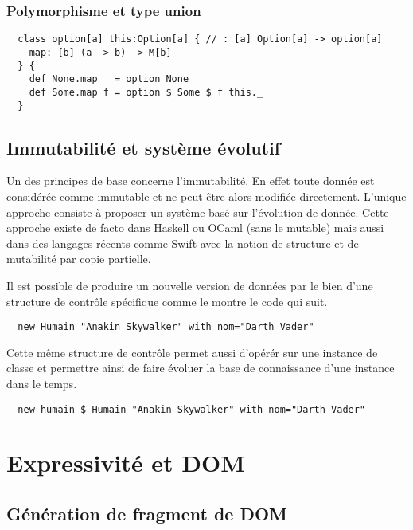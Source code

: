 \documentclass[twoside,a4paper]{article}
\begin{document}
\subsubsection{Polymorphisme et type union}

\lstset{language=Thicket}
\begin{lstlisting}
  class option[a] this:Option[a] { // : [a] Option[a] -> option[a]
    map: [b] (a -> b) -> M[b]
  } {
    def None.map _ = option None
    def Some.map f = option $ Some $ f this._
  }
\end{lstlisting}

\subsection{Immutabilité et système évolutif}

Un  des principes  de base  concerne l'immutabilité.   En effet  toute
donnée est considérée  comme immutable et ne peut  être alors modifiée
directement. L'unique approche consiste à proposer un système basé sur
l'évolution de donnée. Cette approche  existe de facto dans Haskell ou
OCaml (sans  le mutable)  mais aussi dans  des langages  récents comme
Swift \cite{Swift}  avec la notion  de structure et de  mutabilité par
copie partielle.

Il est possible de produire un nouvelle version de données par le bien
d'une structure  de contrôle  spécifique comme le  montre le  code qui
suit.

\lstset{language=Thicket}
\begin{lstlisting}
  new Humain "Anakin Skywalker" with nom="Darth Vader"
\end{lstlisting}

Cette  même  structure  de  contrôle permet  aussi  d'opérér  sur  une
instance de  classe et  permettre ainsi  de faire  évoluer la  base de
connaissance d'une instance dans le temps.

\lstset{language=Thicket}
\begin{lstlisting}
  new humain $ Humain "Anakin Skywalker" with nom="Darth Vader"
\end{lstlisting}

\section{Expressivité et DOM}

\subsection{Génération de fragment de DOM}
\end{document}

